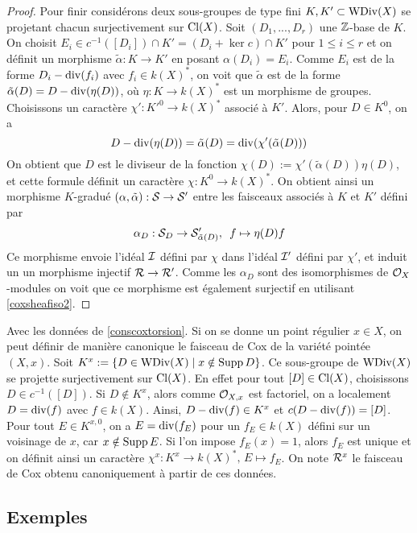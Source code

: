 \begin{proof}
Pour finir considérons deux sous-groupes de type fini $K,K'\subset \operatorname{WDiv}(X)$ se projetant chacun surjectivement sur $\operatorname{Cl}(X)$. Soit $(D_1,...,D_r)$ une $\mathbb{Z}$-base de $K$. On choisit $E_i\in c^{-1}([D_i])\cap K'=(D_i+\ker c)\cap K'$ pour $1\leq i\leq r$ et on définit un morphisme $\tilde{\alpha}:K\rightarrow K'$ en posant $\alpha(D_i)=E_i$. Comme $E_i$ est de la forme $D_i-\operatorname{div}(f_i)$ avec $f_i\in k(X)^*$, on voit que $\tilde{\alpha}$ est de la forme $\tilde{\alpha}(D)=D-\operatorname{div}(\eta(D))$, où $\eta:K\rightarrow k(X)^*$ est un morphisme de groupes. Choisissons un caractère $\chi':K'^0\rightarrow k(X)^*$ associé à $K'$. Alors, pour $D\in K^0$, on a
$$D-\operatorname{div}(\eta(D))=\tilde{\alpha}(D)=\operatorname{div}(\chi'(\tilde{\alpha}(D)))$$
On obtient que $D$ est le diviseur de la fonction $\chi(D):=\chi'(\tilde{\alpha}(D))\eta(D)$, et cette formule définit un caractère $\chi:K^0\rightarrow k(X)^*$. On obtient ainsi un morphisme $K$-gradué $(\alpha,\tilde{\alpha}):\mathcal{S}\rightarrow \mathcal{S}'$ entre les faisceaux associés à $K$ et $K'$ défini par
$$\alpha_D:\mathcal{S}_D\rightarrow \mathcal{S}'_{\tilde{\alpha}(D)},\,\,\, f\mapsto\eta(D)f$$
Ce morphisme envoie l'idéal $\mathcal{I}$ défini par $\chi$ dans l'idéal $\mathcal{I}'$ défini par $\chi'$, et induit un un morphisme injectif $\mathcal{R}\rightarrow \mathcal{R}'$. Comme les $\alpha_D$ sont des isomorphismes de $\mathcal{O}_X$-modules on voit que ce morphisme est également surjectif en utilisant \ref{coxsheafiso2}.
\end{proof}

\begin{rem}
Avec les données de \ref{conscoxtorsion}. Si on se donne un point régulier $x\in X$, on peut définir de manière canonique le faisceau de Cox de la variété pointée $(X, x)$. Soit $K^x:=\lbrace D\in\operatorname{WDiv}(X)\mid x\notin \operatorname{Supp} D\rbrace$.  Ce sous-groupe de $\operatorname{WDiv}(X)$ se projette surjectivement sur $\operatorname{Cl}(X)$. En effet pour tout $[D]\in \operatorname{Cl}(X)$, choisissons $D\in c^{-1}([D])$. Si $D\notin K^x$, alors comme $\mathcal{O}_{X,x}$ est factoriel, on a localement $D=\operatorname{div}(f)$ avec $f\in k(X)$. Ainsi, $D-\operatorname{div}(f)\in K^x$ et $c(D-\operatorname{div}(f)) =[D]$. Pour tout $E\in K^{x,0}$, on a $E=\operatorname{div}(f_E)$ pour un $f_E\in k(X)$ défini sur un voisinage de $x$, car $x\notin \operatorname{Supp} E$. Si l'on impose $f_E(x)=1$, alors $f_E$ est unique et on définit ainsi un caractère $\chi^x:K^x\rightarrow k(X)^*,\,E\mapsto f_E$. On note $\mathcal{R}^x$ le faisceau de Cox obtenu canoniquement à partir de ces données.
\end{rem}

\subsection{Exemples}

